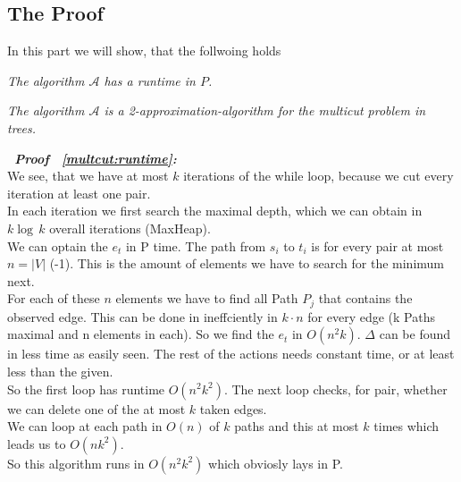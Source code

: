\subsection*{The Proof}

In this part we will show, that the follwoing holds\\

\begin{lemma}\label{multcut:runtime}\mdseries\itshape
The algorithm $\mathcal{A}$ has a runtime in $P$.
\end{lemma}
\begin{lemma}\label{multcut:apx}\mdseries\itshape
The algorithm $\mathcal{A}$ is a 2-approximation-algorithm
for the multicut problem in trees.
\end{lemma}

\begin{description}
   \item{\bfseries\itshape~Proof ~\ref{multcut:runtime}:}\\
      We see, that we have at most $k$ iterations of the while loop,
      because we cut every iteration at least one pair.\\
      In each iteration we first search the maximal depth, which we can
      obtain in $k \log \, k$ overall iterations (MaxHeap).\\
      We can optain the $e_t$ in P time. The path from $s_i$ to $t_i$
      is for every pair at most $n = |V|$ (-1). This is the amount
      of elements we have to search for the minimum next.\\
      For each of these $n$ elements we have to find all Path $P_j$
      that contains the observed edge. This can be done in ineffciently in
      $k \cdot n$ for every edge (k Paths maximal and n elements in each).
      So we find the $e_t$ in $O(n^2 k)$. $\Delta$ can be found in less
      time as easily seen. The rest of the actions needs constant time,
      or at least less than the given.\\
      So the first loop has runtime $O(n^2k^2)$. The next loop checks, for
      pair, whether we can delete one of the at most $k$ taken edges.\\
      We can loop at each path in $O(n)$ of $k$ paths and this at most $k$ times
      which leads us to $O(nk^2)$.\\
      So this algorithm runs in $O(n^2k^2)$ which obviosly lays in P.


\end{description}
